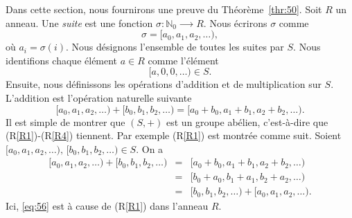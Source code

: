 Dans cette section, nous fournirons une preuve du Théorème~\ref{thr:50}. Soit $R$ un anneau. Une \emph{suite} est une fonction $σ: ℕ_0 ⟶ R$. Nous écrirons $σ$ comme
\begin{displaymath}
  σ = [a_0,a_1,a_2, \dots ),
\end{displaymath}
où $a_i = σ(i)$. Nous désignons l'ensemble de toutes les suites par $S$.  Nous identifions chaque élément $a ∈R$  comme l'élément
\begin{displaymath}
  [a,0,0, \dots) ∈S. 
\end{displaymath}
%
Ensuite, nous définissons les opérations d'addition et de multiplication sur $S$. L'addition est l'opération naturelle suivante
\begin{displaymath}
  [a_0,a_1,a_2, \dots ) + [b_0,b_1,b_2, \dots ) = [a_0+b_0,a_1+b_1,a_2+b_2, \dots ). 
\end{displaymath}
Il est simple de montrer que $(S,+)$ est un groupe abélien, c'est-à-dire que (R\ref{R1})-(R\ref{R4}) tiennent. Par exemple (R\ref{R1}) est montrée comme suit. Soient $ [a_0,a_1,a_2, \dots ), \, [b_0,b_1,b_2, \dots ) ∈ S$. On a
\begin{eqnarray}
  \label{eq:54}
  [a_0,a_1,a_2, \dots ) +  [b_0,b_1,b_2, \dots )  & = &  [a_0+b_0,a_1+b_1,a_2+b_2, \dots ) \label{eq:55} \\
  & = &        [b_0+a_0,b_1+a_1,b_2+a_2, \dots ) \label{eq:56} \\
  & = & [b_0,b_1,b_2, \dots ) + [a_0,a_1,a_2, \dots ).
\end{eqnarray}
Ici, \eqref{eq:56} est à cause de  (R\ref{R1}) dans l'anneau $R$.

